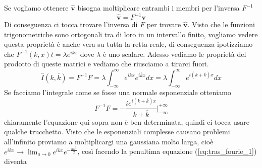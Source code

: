 \documentclass[11pt,a4paper]{report}
\newcommand{\vettore}[1]{\mathbf{#1}}
\theoremstyle{definition}
\theoremstyle{plain}
\theoremstyle{plain}
\begin{document}
			Se vogliamo ottenere $\vettore{\hat v}$ bisogna moltiplicare entrambi i membri per l'inversa $F^{-1}$
			\begin{equation}
				\vettore{\hat v}=F^{-1}\vettore{v}
			\end{equation}
			Di conseguenza ci tocca trovare l'inversa di $F$ per trovare $\vettore{\hat v}$.\newline
			Visto che le funzioni trigonometriche sono ortogonali tra di loro in un intervallo finito, vogliamo vedere questa proprietà è anche vera su tutta la retta reale, di conseguenza ipotizziamo che $F^{-1}(k,x)t=\lambda e^{ikx}$ dove $\lambda$ è uno scalare.
			Adesso vediamo le proprietà del prodotto di queste matrici e vediamo che riusciamo a tirarci fuori.
			\begin{equation}
			\label{eq:tras_fourie_1}
				\hat I(k,\overline k)=F^{-1}F=\lambda\int_{-\infty}^{\infty}e^{ikx}e^{i\overline k x}dx=\lambda\int_{-\infty}^{\infty}e^{i(k+\overline k)x}dx
			\end{equation}
			Se facciamo l'integrale come se fosse una normale esponenziale otteniamo 
			\[
				F^{-1}F=-\frac{ie^{i(k+\overline k)x}}{k + \overline k}\bigg|_{-\infty}^{+\infty}	
			\]
			chiaramente l'equazione qui sopra non è ben determinata, quindi ci tocca usare qualche trucchetto.\newline
			Visto che le esponenziali complesse causano problemi all'infinito proviamo a moltiplicargi una gaussiana molto larga, cioè $e^{ikx}\rightarrow \lim_{a\to 0}e^{ikx}e^{-\frac{ax^2}{2}}$, così facendo la penultima equazione (\ref{eq:tras_fourie_1}) diventa
\end{document}
